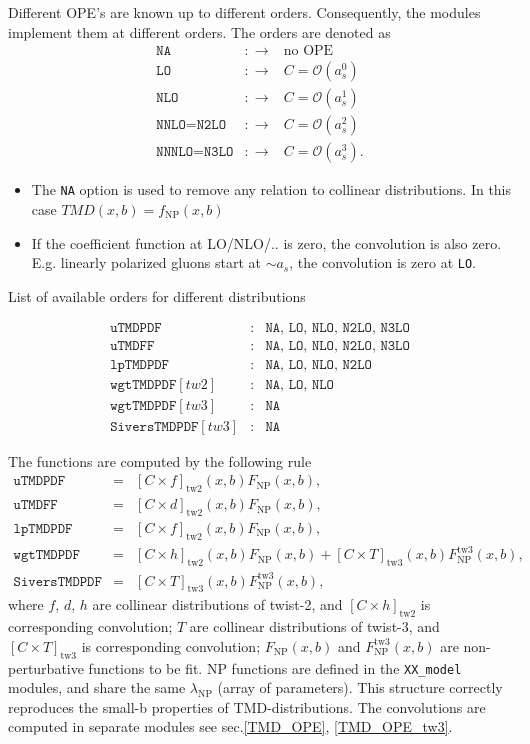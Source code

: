 \documentclass[prd,nofootinbib,eqsecnum,final]{revtex4}
\renewcommand{\(}{\left(}
\renewcommand{\)}{\right)}
\renewcommand{\[}{\left[}
\renewcommand{\]}{\right]}
\begin{document}
Different OPE's are known up to different orders. Consequently, the modules implement them at different orders. The orders are denoted as
\begin{eqnarray*}
\texttt{NA}&:\to & \text{no OPE}
\\
\texttt{LO}&:\to & C=\mathcal{O}(a_s^0)
\\
\texttt{NLO}&:\to & C=\mathcal{O}(a_s^1)
\\
\texttt{NNLO}=\texttt{N2LO}&:\to & C=\mathcal{O}(a_s^2)
\\
\texttt{NNNLO}=\texttt{N3LO}&:\to & C=\mathcal{O}(a_s^3).
\end{eqnarray*}
\begin{itemize}
\item The \texttt{NA} option is used to remove any relation to collinear distributions. In this case $TMD(x,b)=f_{\text{NP}}(x,b)$
\item If the coefficient function at LO/NLO/.. is zero, the convolution is also zero. E.g. linearly polarized gluons start at $\sim a_s$, the convolution is zero at \texttt{LO}. 
\end{itemize}
\begin{center}
List of available orders for different distributions
\end{center}
\begin{eqnarray*}
\texttt{uTMDPDF}&:& \texttt{NA, LO, NLO, N2LO, N3LO}
\\
\texttt{uTMDFF}&:& \texttt{NA, LO, NLO, N2LO, N3LO}
\\
\texttt{lpTMDPDF}&:& \texttt{NA, LO, NLO, N2LO}
\\
\texttt{wgtTMDPDF}[tw2]&:& \texttt{NA, LO, NLO}
\\
\texttt{wgtTMDPDF}[tw3]&:& \texttt{NA}
\\
\texttt{SiversTMDPDF}[tw3]&:& \texttt{NA}
\end{eqnarray*}

The functions are computed by the following rule
\begin{eqnarray}
\texttt{uTMDPDF}&=&[C\times f]_{\text{tw2}}(x,b)F_{\text{NP}}(x,b),
\\
\texttt{uTMDFF}&=&[C\times d]_{\text{tw2}}(x,b)F_{\text{NP}}(x,b),
\\
\texttt{lpTMDPDF}&=&[C\times f]_{\text{tw2}}(x,b)F_{\text{NP}}(x,b),
\\
\texttt{wgtTMDPDF}&=&[C\times h]_{\text{tw2}}(x,b)F_{\text{NP}}(x,b)+[C\times T]_{\text{tw3}}(x,b)F^{\text{tw3}}_{\text{NP}}(x,b),
\\
\texttt{SiversTMDPDF}&=&[C\times T]_{\text{tw3}}(x,b)F^{\text{tw3}}_{\text{NP}}(x,b),
\end{eqnarray}
where $f$, $d$, $h$ are collinear distributions of twist-2, and $[C\times h]_{\text{tw2}}$ is corresponding convolution;
$T$ are collinear distributions of twist-3, and $[C\times T]_{\text{tw3}}$ is corresponding convolution; $F_{\text{NP}}(x,b)$ and $F^{\text{tw3}}_{\text{NP}}(x,b)$ are non-perturbative functions to be fit. NP functions are defined in the \texttt{XX\_model} modules, and share the same $\lambda_{\text{NP}}$ (array of parameters). This structure correctly reproduces the small-b properties of TMD-distributions. The convolutions are computed in separate modules see sec.\ref{TMD_OPE}, \ref{TMD_OPE_tw3}.
\end{document}
